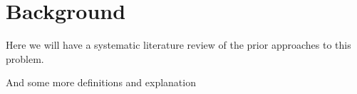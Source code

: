 \chapter{Background} \label{Chapter:one}
Here we will have a systematic literature review of the prior
approaches to this problem.

And some more definitions and explanation